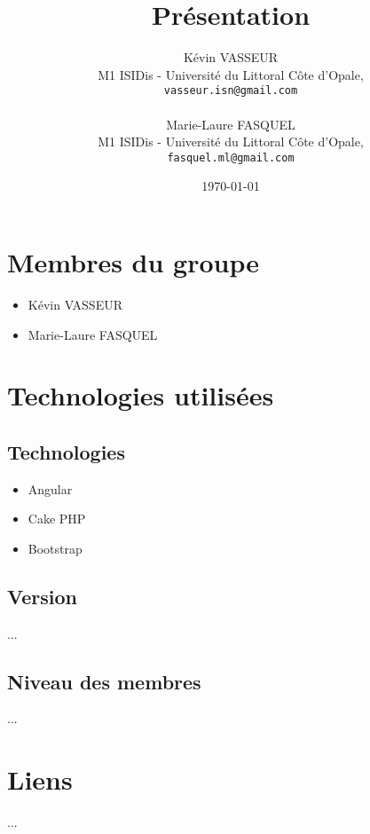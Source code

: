 \documentclass{article}
\title{Présentation}
\author{Kévin VASSEUR\\
   M1 ISIDis - Université du Littoral Côte d'Opale,\\
   \texttt{vasseur.isn@gmail.com}\\
   \\
   Marie-Laure FASQUEL\\
   M1 ISIDis - Université du Littoral Côte d'Opale,\\
   \texttt{fasquel.ml@gmail.com}
}
\date{\today}
\begin{document}
	
	\maketitle
	
	\section{Membres du groupe}
	\begin{itemize}
		\item K\'{e}vin VASSEUR
		\item Marie-Laure FASQUEL
	\end{itemize}
	
	\section{Technologies utilis\'{e}es}
		\subsection{Technologies}
			\begin{itemize}
				\item Angular
				\item Cake PHP
				\item Bootstrap
			\end{itemize}
		\subsection{Version}
		...
		\subsection{Niveau des membres}
		...
		
	\section{Liens}
	...
\end{document}
